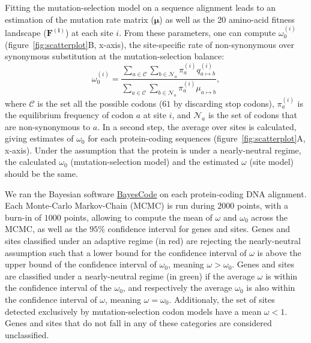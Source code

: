 \documentclass{article}
\newcommand{\UniDimArray}[1]{\bm{#1}}
\begin{document}
    Fitting the mutation-selection model on a sequence alignment leads to an estimation of the mutation rate matrix ($\UniDimArray{\mu}$) as well as the 20 amino-acid fitness landscape ($\UniDimArray{F^{(i)}}$) at each site $i$.
    From these parameters, one can compute $\omega_{0}^{(i)}$ (figure~\ref{fig:scatterplot}B, x-axis), the site-specific rate of non-synonymous over synonymous substitution at the mutation-selection balance:
    \begin{equation}
        \omega_{0}^{(i)} = \dfrac{\sum_{a \in \mathcal{C}} \sum_{b \in \mathcal{N}_a} \pi_a^{(i)} q_{a \mapsto b}^{(i)}}{\sum_{a \in \mathcal{C}} \sum_{b \in \mathcal{N}_a} \pi_a^{(i)} \mu_{a \mapsto b}},
    \end{equation}
    where $\mathcal{C}$ is the set all the possible codons ($61$ by discarding stop codons), $\pi_a^{(i)}$ is the equilibrium frequency of codon $a$ at site $i$, and $\mathcal{N}_a$ is the set of codons that are non-synonymous to $a$\cite{spielman_relationship_2015, rodrigue_detecting_2017}.
    In a second step, the average over sites is calculated, giving estimates of $\omega_{0}$ for each protein-coding sequences (figure~\ref{fig:scatterplot}A, x-axis).
    Under the assumption that the protein is under a nearly-neutral regime, the calculated $\omega_{0}$ (mutation-selection model) and the estimated $\omega$ (site model) should be the same\cite{spielman_relationship_2015}.

    We ran the Bayesian software \href{https://github.com/bayesiancook/bayescode}{BayesCode} on each protein-coding DNA alignment\cite{lartillot_phylobayes_2013, rodrigue_detecting_2017}.
    Each Monte-Carlo Markov-Chain (MCMC) is run during $2000$ points, with a burn-in of $1000$ points, allowing to compute the mean of $\omega$ and $\omega_{0}$ across the MCMC, as well as the $95$\% confidence interval for genes and sites.
    Genes and sites classified under an adaptive regime (in red) are rejecting the nearly-neutral assumption such that a lower bound for the confidence interval of $\omega$ is above the upper bound of the confidence interval of $\omega_{0}$, meaning $\omega > \omega_{0}$.
    Genes and sites are classified under a nearly-neutral regime (in green) if the average $\omega$ is within the confidence interval of the $\omega_{0}$, and respectively the average $\omega_{0}$ is also within the confidence interval of  $\omega$, meaning $\omega = \omega_{0}$.
    Additionaly, the set of sites detected exclusively by mutation-selection codon models have a mean $\omega < 1 $.
    Genes and sites that do not fall in any of these categories are considered unclassified.
\end{document}
